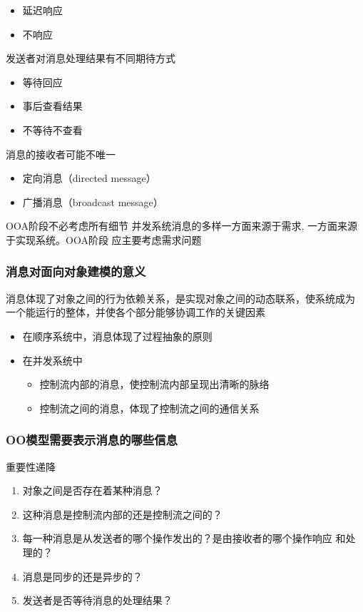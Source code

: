 \documentclass[compress]{beamer}
\begin{document}
\begin{frame}
\begin{itemize}
{\begin{itemize}
        \item 延迟响应
        \item 不响应
      \end{itemize}
    }
     {
    \item 发送者对消息处理结果有不同期待方式
      \begin{itemize}
        \item 等待回应
        \item 事后查看结果
        \item 不等待不查看
      \end{itemize}
    }
     {
    \item 消息的接收者可能不唯一
      \begin{itemize}
        \item 定向消息（directed message）
        \item 广播消息（broadcast message）
      \end{itemize}
    }
  \end{itemize}
   {
    \begin{alertblock}{OOA阶段不必考虑所有细节}
      并发系统消息的多样一方面来源于需求, 一方面来源于实现系统。OOA阶段
      应主要考虑需求问题
    \end{alertblock}
  }
\end{frame}

\begin{frame}
  \frametitle{消息对面向对象建模的意义}
  消息体现了对象之间的行为依赖关系，是实现对象之间的动态联系，使系统成为
  一个能运行的整体，并使各个部分能够协调工作的关键因素

  \begin{itemize}
    \item 在顺序系统中，消息体现了过程抽象的原则
    \item 在并发系统中
      \begin{itemize}
        \item 控制流内部的消息，使控制流内部呈现出清晰的脉络
        \item 控制流之间的消息，体现了控制流之间的通信关系
      \end{itemize}
  \end{itemize}
\end{frame}

\begin{frame}
  \frametitle{OO模型需要表示消息的哪些信息}
  重要性递降
    \begin{enumerate}
      \item 对象之间是否存在着某种消息？
      \item 这种消息是控制流内部的还是控制流之间的？
      \item 每一种消息是从发送者的哪个操作发出的？是由接收者的哪个操作响应
      和处理的？
    \item 消息是同步的还是异步的？
    \item 发送者是否等待消息的处理结果？
  \end{enumerate}
\end{frame}
\end{document}
